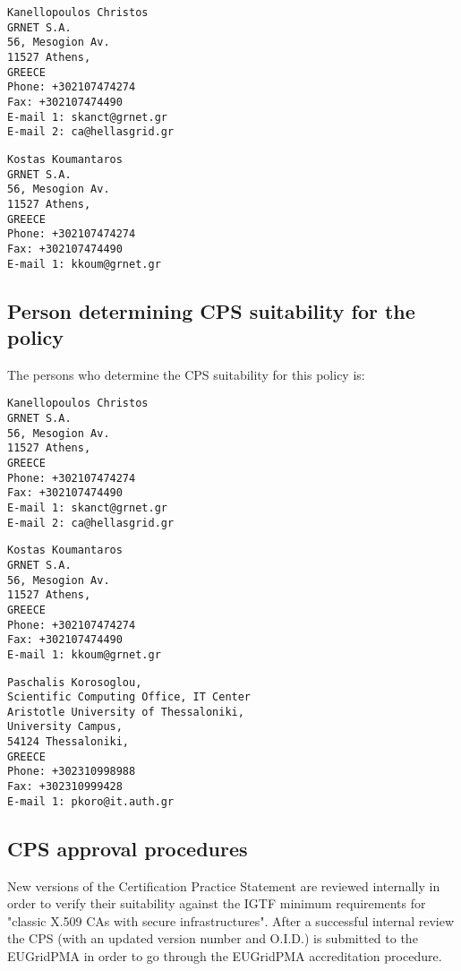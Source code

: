 \begin{verbatim}
Kanellopoulos Christos
GRNET S.A.
56, Mesogion Av.
11527 Athens,
GREECE
Phone: +302107474274
Fax: +302107474490
E-mail 1: skanct@grnet.gr
E-mail 2: ca@hellasgrid.gr
\end{verbatim}

\begin{verbatim}
Kostas Koumantaros
GRNET S.A.
56, Mesogion Av.
11527 Athens,
GREECE
Phone: +302107474274
Fax: +302107474490
E-mail 1: kkoum@grnet.gr
\end{verbatim}

\subsection{Person determining CPS suitability for the policy}

The persons who determine the CPS suitability for this policy is:

\begin{verbatim}
Kanellopoulos Christos
GRNET S.A.
56, Mesogion Av.
11527 Athens,
GREECE
Phone: +302107474274
Fax: +302107474490
E-mail 1: skanct@grnet.gr
E-mail 2: ca@hellasgrid.gr
\end{verbatim}

\begin{verbatim}
Kostas Koumantaros
GRNET S.A.
56, Mesogion Av.
11527 Athens,
GREECE
Phone: +302107474274
Fax: +302107474490
E-mail 1: kkoum@grnet.gr
\end{verbatim}

\begin{verbatim}
Paschalis Korosoglou,
Scientific Computing Office, IT Center
Aristotle University of Thessaloniki,
University Campus,
54124 Thessaloniki,
GREECE
Phone: +302310998988
Fax: +302310999428
E-mail 1: pkoro@it.auth.gr
\end{verbatim}


\subsection{CPS approval procedures}
\label{sub:CPSApprovalProcedures}

New versions of the Certification Practice Statement are reviewed internally in order to verify their suitability against the IGTF minimum requirements for "classic X.509 CAs with secure infrastructures".  After a successful internal review the CPS (with an updated version number and O.I.D.) is submitted to the EUGridPMA in order to go through the EUGridPMA accreditation procedure.


